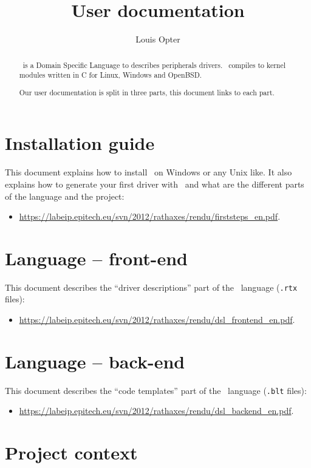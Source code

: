\documentclass[american]{rtxarticle}
\title{User documentation}
\author{Louis Opter}
\begin{document}
\maketitle

\begin{abstract}
\rtx\ is a Domain Specific Language to describes peripherals drivers. \rtx\
compiles to kernel modules written in C for Linux, Windows and OpenBSD.

Our user documentation is split in three parts, this document links
to each part.
\end{abstract}

\section{Installation guide}

This document explains how to install \rtx\ on Windows or any Unix like. It
also explains how to generate your first driver with \rtx\ and what are the
different parts of the language and the project:
\begin{itemize}
\item {\small\url{https://labeip.epitech.eu/svn/2012/rathaxes/rendu/firststeps_en.pdf}}.
\end{itemize}

\section{Language -- front-end}

This document describes the ``driver descriptions'' part of the \rtx\ language
(\texttt{.rtx} files):
\begin{itemize}
\item {\small\url{https://labeip.epitech.eu/svn/2012/rathaxes/rendu/dsl_frontend_en.pdf}}.
\end{itemize}

\section{Language -- back-end}

This document describes the ``code templates'' part of the \rtx\ language
(\texttt{.blt} files):
\begin{itemize}
\item {\small\url{https://labeip.epitech.eu/svn/2012/rathaxes/rendu/dsl_backend_en.pdf}}.
\end{itemize}

\section*{Project context}
\end{document}
